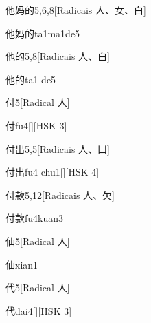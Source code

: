 \begin{entry}{他妈的}{5,6,8}[Radicais ⼈、⼥、⽩]
  \begin{phonetics}{他妈的}{ta1ma1de5}
  \end{phonetics}
\end{entry}

\begin{entry}{他的}{5,8}[Radicais ⼈、⽩]
  \begin{phonetics}{他的}{ta1 de5}
  \end{phonetics}
\end{entry}

\begin{entry}{付}{5}[Radical ⼈]
  \begin{phonetics}{付}{fu4}[][HSK 3]
  \end{phonetics}
\end{entry}

\begin{entry}{付出}{5,5}[Radicais ⼈、⼐]
  \begin{phonetics}{付出}{fu4 chu1}[][HSK 4]
  \end{phonetics}
\end{entry}

\begin{entry}{付款}{5,12}[Radicais ⼈、⽋]
  \begin{phonetics}{付款}{fu4kuan3}
  \end{phonetics}
\end{entry}

\begin{entry}{仙}{5}[Radical ⼈]
  \begin{phonetics}{仙}{xian1}
  \end{phonetics}
\end{entry}

\begin{entry}{代}{5}[Radical ⼈]
  \begin{phonetics}{代}{dai4}[][HSK 3]
  \end{phonetics}
\end{entry}

